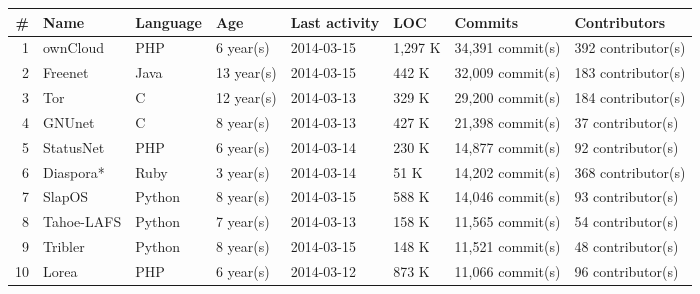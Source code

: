 \begin{tabular}[p]{| r | l | p{3cm} | p{3cm} | p{3cm} | p{3cm} | p{3cm} | p{3cm} |}
	\hline
	\textbf{\#} & \textbf{Name} & \textbf{Language} & \textbf{Age} & \textbf{Last activity} & \textbf{LOC} & \textbf{Commits} & \textbf{Contributors} \\ \hline

	1 & ownCloud & PHP & 6 year(s) & 2014-03-15 & 1,297 K & 34,391 commit(s) & 392 contributor(s) \\ \hline
	2 & Freenet & Java & 13 year(s) & 2014-03-15 & 442 K & 32,009 commit(s) & 183 contributor(s) \\ \hline
	3 & Tor & C & 12 year(s) & 2014-03-13 & 329 K & 29,200 commit(s) & 184 contributor(s) \\ \hline
	4 & GNUnet & C & 8 year(s) & 2014-03-13 & 427 K & 21,398 commit(s) & 37 contributor(s) \\ \hline
	5 & StatusNet & PHP & 6 year(s) & 2014-03-14 & 230 K & 14,877 commit(s) & 92 contributor(s) \\ \hline
	6 & Diaspora* & Ruby & 3 year(s) & 2014-03-14 & 51 K & 14,202 commit(s) & 368 contributor(s) \\ \hline
	7 & SlapOS & Python & 8 year(s) & 2014-03-15 & 588 K & 14,046 commit(s) & 93 contributor(s) \\ \hline
	8 &Tahoe-LAFS & Python & 7 year(s) & 2014-03-13 & 158 K & 11,565 commit(s) & 54 contributor(s) \\ \hline
	9 & Tribler & Python & 8 year(s) & 2014-03-15 & 148 K & 11,521 commit(s) & 48 contributor(s) \\ \hline
	10 & Lorea & PHP & 6 year(s) & 2014-03-12 & 873 K & 11,066 commit(s) & 96 contributor(s) \\ \hline
\end{tabular}
